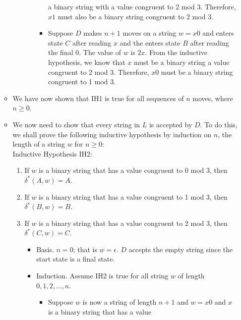 \documentclass[]{article}
\begin{document}
\begin{enumerate}
\begin{itemize}
\begin{enumerate}
\begin{itemize}
\begin{itemize}
                    a binary string with a value congruent to 2 mod 3. 
                    Therefore, $x1$ must also be a binary string congruent to 2 
                    mod 3.
                    \item Suppose $D$ makes $n + 1$ moves on a string $w = x0$
                    and enters state $C$ after reading $x$ and the enters state 
                    $B$ after reading the final $0$. The value of $w$ is $2x$. 
                    From the inductive hypothesis, we know that $x$ must be a 
                    binary string a value congruent to 2 mod 3. Therefore, $x0$ 
                    must be a binary string congruent to 1 mod 3.
                  \end{itemize}
              \end{itemize}
          \end{enumerate}
        \item We have now shown that IH1 is true for all sequences of $n$ moves, 
        where $n \geq 0$.
        \item We now need to show that every string in $L$ is accepted by $D$. 
        To do this, we shall prove the following inductive hypothesis by 
        induction on $n$, the length of a string $w$ for $n \geq 0$: \\
        Inductive Hypothesis IH2:
          \begin{enumerate}
            \item If $w$ is a binary string that has a value congruent to 0 mod 
            3, then $\delta^*(A,w) = A$. 
            \item If $w$ is a binary string that has a value congruent to 1 mod 
            3, then $\delta^*(B,w) = B$.
            \item If $w$ is a binary string that has a value congruent to 2 mod
            3, then $\delta^*(C,w) = C$.
              \begin{itemize}
                \item Basis. $n = 0$; that is $w = \epsilon$. $D$ accepts the 
                empty string since the start state is a final state.
                \item Induction. Assume IH2 is true for all string $w$ of length 
                $0,1,2,\ldots,n$.
                  \begin{itemize}
                    \item Suppose $w$ is now a string of length $n + 1$ and 
                    $w = x0$ and $x$ is a binary string that has a value 

\end{itemize}
\end{itemize}
\end{enumerate}
\end{itemize}
\end{enumerate}
\end{document}
